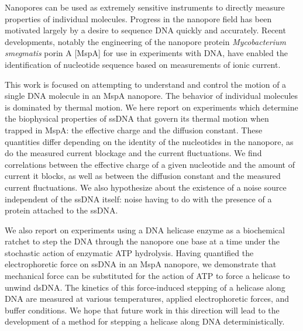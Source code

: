 
Nanopores can be used as extremely sensitive instruments to directly measure properties of individual molecules.  Progress in the nanopore field has been motivated largely by a desire to sequence DNA quickly and accurately.  Recent developments, notably the engineering of the nanopore protein \textit{Mycobacterium smegmatis} porin A [MspA] for use in experiments with DNA, have enabled the identification of nucleotide sequence based on measurements of ionic current.

This work is focused on attempting to understand and control the motion of a single DNA molecule in an MspA nanopore.  The behavior of individual molecules is dominated by thermal motion.  We here report on experiments which determine the biophysical properties of ssDNA that govern its thermal motion when trapped in MspA: the effective charge and the diffusion constant.  These quantities differ depending on the identity of the nucleotides in the nanopore, as do the measured current blockage and the current fluctuations.  We find correlations between the effective charge of a given nucleotide and the amount of current it blocks, as well as between the diffusion constant and the measured current fluctuations.  We also hypothesize about the existence of a noise source independent of the ssDNA itself: noise having to do with the presence of a protein attached to the ssDNA.

We also report on experiments using a DNA helicase enzyme as a biochemical ratchet to step the DNA through the nanopore one base at a time under the stochastic action of enzymatic ATP hydrolysis.  Having quantified the electrophoretic force on ssDNA in an MspA nanopore, we demonstrate that mechanical force can be substituted for the action of ATP to force a helicase to unwind dsDNA.  The kinetics of this force-induced stepping of a helicase along DNA are measured at various temperatures, applied electrophoretic forces, and buffer conditions.  We hope that future work in this direction will lead to the development of a method for stepping a helicase along DNA deterministically.